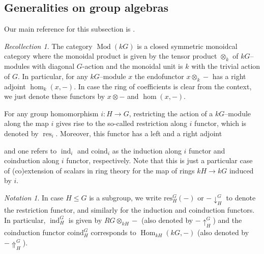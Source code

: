 \documentclass{amsart}
\newcommand{\res}{\operatorname{res}\nolimits}
\newcommand{\ind}{\operatorname{ind}\nolimits}
\newcommand{\Hom}{\operatorname{Hom}\nolimits}
\DeclareMathOperator{\Mod}{Mod}
\numberwithin{equation}{section}%
\theoremstyle{remark}
\newtheorem{recollection}[equation]{Recollection}
\newtheorem{notation}[equation]{Notation}
\begin{document}
\subsection{Generalities on group algebras} %
Our main reference for this subsection is \cite{benson97}.

\begin{recollection}\label{rec-adjuntions-mod}
The category $\Mod(kG)$ is a closed symmetric monoidcal category where the monoidal product is given by the tensor product $\otimes_k$ of $kG$--modules with diagonal $G$-action and the monoidal unit is $k$ with the trivial action of $G$. In particular, for any $kG$--module $x$ the endofunctor $x\otimes_k-$ has a right adjoint $\hom_k(x,-)$. In case the ring of coefficients is clear from the context, we just denote these functors by $x\otimes-$ and $\hom(x,-)$. 

 For any group homomorphism  $i\colon H\to G$, restricting the action of a $kG$--module along the map $i$ gives rise to the so-called restriction along $i$ functor, which is denoted by $\res_i$. Moreover, this functor has a left and a right adjoint 
\begin{center}
    \end{center}
and one refers to $\ind_i$ and $\mathrm{coind}_i$ as the induction along $i$ functor and coinduction along $i$ functor, respectively. Note that this is just a particular case of (co)extension of scalars in ring theory for the map of rings $kH\to kG$ induced by $i$. 
\end{recollection}

\begin{notation}
    In case $H\leqslant G$ is a subgroup, we write  $\mathrm{res}^G_H(-)$ or $- \downarrow_H^G$ to denote the restriction functor, and similarly for the induction and coinduction functors. In particular,  $\ind_H^G$ is given by  $RG\otimes_{kH}-$  (also denoted by $- \uparrow^G_H$) and the coinduction functor $\mathrm{coind}_H^G$ corresponds to   $\Hom_{kH}(kG,-)$ (also denoted by $- \Uparrow^G_H$).
\end{notation}
\end{document}
